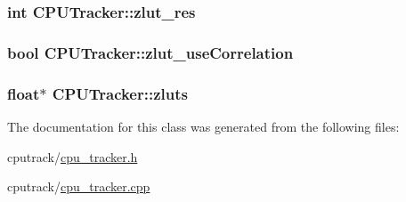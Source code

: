 \subsubsection[{\texorpdfstring{zlut\+\_\+res}{zlut_res}}]{\setlength{\rightskip}{0pt plus 5cm}int C\+P\+U\+Tracker\+::zlut\+\_\+res}\hypertarget{class_c_p_u_tracker_a058eae282c9bf847cd8e39664688c5bc}{}\label{class_c_p_u_tracker_a058eae282c9bf847cd8e39664688c5bc}
\subsubsection[{\texorpdfstring{zlut\+\_\+use\+Correlation}{zlut_useCorrelation}}]{\setlength{\rightskip}{0pt plus 5cm}bool C\+P\+U\+Tracker\+::zlut\+\_\+use\+Correlation}\hypertarget{class_c_p_u_tracker_a324e4b9cfe1337d9c33bf9690e6c1ef6}{}\label{class_c_p_u_tracker_a324e4b9cfe1337d9c33bf9690e6c1ef6}
\subsubsection[{\texorpdfstring{zluts}{zluts}}]{\setlength{\rightskip}{0pt plus 5cm}float$\ast$ C\+P\+U\+Tracker\+::zluts}\hypertarget{class_c_p_u_tracker_ac187d3124a66c6743c2037bb82d9a67d}{}\label{class_c_p_u_tracker_ac187d3124a66c6743c2037bb82d9a67d}


The documentation for this class was generated from the following files\+:\begin{DoxyCompactItemize}
\item 
cputrack/\hyperlink{cpu__tracker_8h}{cpu\+\_\+tracker.\+h}\item 
cputrack/\hyperlink{cpu__tracker_8cpp}{cpu\+\_\+tracker.\+cpp}\end{DoxyCompactItemize}
